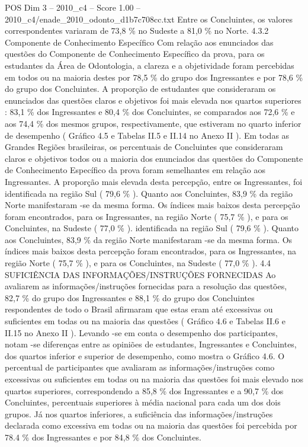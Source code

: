 \begin{textsample}{POS Dim 3 – 2010\_c4 – Score 1.00 – 2010\_c4/enade\_2010\_odonto\_d1b7c708cc.txt}
Entre os Concluintes, os valores correspondentes variaram de 73,8 \% no Sudeste a 81,0 \% no Norte. 4.3.2 Componente de Conhecimento Específico Com relação aos enunciados das questões do Componente de Conhecimento Específico da prova, para os estudantes da Área de Odontologia, a clareza e a objetividade foram percebidas em todos ou na maioria destes por 78,5 \% do grupo dos Ingressantes e por 78,6 \% do grupo dos Concluintes.
A proporção de estudantes que consideraram os enunciados das questões claros e objetivos foi mais elevada nos quartos superiores : 83,1 \% dos Ingressantes e 80,4 \% dos Concluintes, se comparados aos 72,6 \% e aos 74,4 \% dos mesmos grupos, respectivamente, que estiveram no quarto inferior de desempenho ( Gráfico 4.5 e Tabelas II.5 e II.14 no Anexo II ).
Em todas as Grandes Regiões brasileiras, os percentuais de Concluintes que consideraram claros e objetivos todos ou a maioria dos enunciados das questões do Componente de Conhecimento Específico da prova foram semelhantes em relação aos Ingressantes.
A proporção mais elevada desta percepção, entre os Ingressantes, foi identificada na região Sul ( 79,6 \% ).
Quanto aos Concluintes, 83,9 \% da região Norte manifestaram -se da mesma forma.
Os índices mais baixos desta percepção foram encontrados, para os Ingressantes, na região Norte ( 75,7 \% ), e para os Concluintes, na Sudeste ( 77,0 \% ). identificada na região Sul ( 79,6 \% ).
Quanto aos Concluintes, 83,9 \% da região Norte manifestaram -se da mesma forma.
Os índices mais baixos desta percepção foram encontrados, para os Ingressantes, na região Norte ( 75,7 \% ), e para os Concluintes, na Sudeste ( 77,0 \% ). 4.4 SUFICIÊNCIA DAS INFORMAÇÕES/INSTRUÇÕES FORNECIDAS Ao avaliarem as informações/instruções fornecidas para a resolução das questões, 82,7 \% do grupo dos Ingressantes e 88,1 \% do grupo dos Concluintes respondentes de todo o Brasil afirmaram que estas eram até excessivas ou suficientes em todas ou na maioria das questões ( Gráfico 4.6 e Tabelas II.6 e II.15 no Anexo II ).
Levando -se em conta o desempenho dos participantes, notam -se diferenças entre as opiniões de estudantes, Ingressantes e Concluintes, dos quartos inferior e superior de desempenho, como mostra o Gráfico 4.6.
O percentual de participantes que avaliaram as informações/instruções como excessivas ou suficientes em todas ou na maioria das questões foi mais elevado nos quartos superiores, correspondendo a 85,8 \% dos Ingressantes e a 90,7 \% dos Concluintes, percentuais superiores à média nacional para cada um dos dois grupos.
Já nos quartos inferiores, a suficiência das informações/instruções declarada como excessiva em todas ou na maioria das questões foi percebida por 78.4 \% dos Ingressantes e por 84,8 \% dos Concluintes.

\end{textsample}
